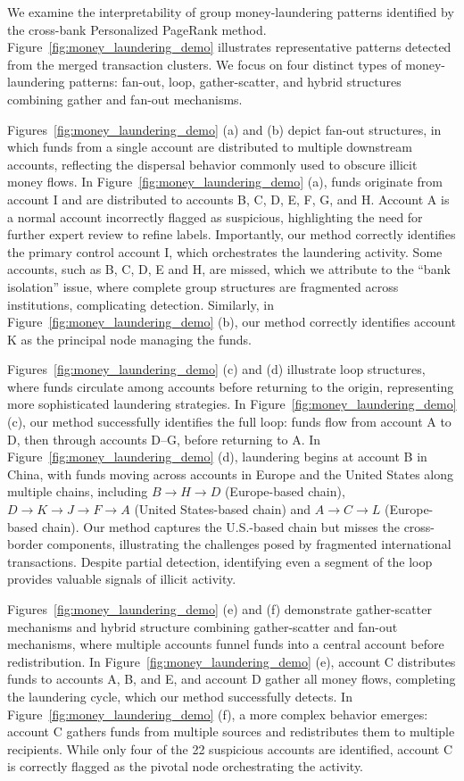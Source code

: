 We examine the interpretability of group money-laundering patterns identified by the cross-bank Personalized PageRank method. Figure~\ref{fig:money_laundering_demo} illustrates representative patterns detected from the merged transaction clusters. We focus on four distinct types of money-laundering patterns: fan-out, loop, gather-scatter, and hybrid structures combining gather and fan-out mechanisms.

Figures~\ref{fig:money_laundering_demo} (a) and (b) depict fan-out structures, in which funds from a single account are distributed to multiple downstream accounts, reflecting the dispersal behavior commonly used to obscure illicit money flows. In Figure~\ref{fig:money_laundering_demo} (a), funds originate from account I and are distributed to accounts B, C, D, E, F, G, and H. Account A is a normal account incorrectly flagged as suspicious, highlighting the need for further expert review to refine labels. Importantly, our method correctly identifies the primary control account I, which orchestrates the laundering activity. Some accounts, such as B, C, D, E and H, are missed, which we attribute to the “bank isolation” issue, where complete group structures are fragmented across institutions, complicating detection. Similarly, in Figure~\ref{fig:money_laundering_demo} (b), our method correctly identifies account K as the principal node managing the funds.

Figures~\ref{fig:money_laundering_demo} (c) and (d) illustrate loop structures, where funds circulate among accounts before returning to the origin, representing more sophisticated laundering strategies. In Figure~\ref{fig:money_laundering_demo} (c), our method successfully identifies the full loop: funds flow from account A to D, then through accounts D–G, before returning to A. In Figure~\ref{fig:money_laundering_demo} (d), laundering begins at account B in China, with funds moving across accounts in Europe and the United States along multiple chains, including $B \rightarrow H \rightarrow D$ (Europe-based chain), $D \rightarrow K \rightarrow J \rightarrow F \rightarrow A$ (United States-based chain) and  $A \rightarrow C \rightarrow L$ (Europe-based chain). Our method captures the U.S.-based chain but misses the cross-border components, illustrating the challenges posed by fragmented international transactions. Despite partial detection, identifying even a segment of the loop provides valuable signals of illicit activity.

Figures~\ref{fig:money_laundering_demo} (e) and (f) demonstrate gather-scatter mechanisms and hybrid structure combining gather-scatter and fan-out mechanisms, where multiple accounts funnel funds into a central account before redistribution. In Figure~\ref{fig:money_laundering_demo} (e), account C distributes funds to accounts A, B, and E, and account D gather all money flows, completing the laundering cycle, which our method successfully detects. In Figure~\ref{fig:money_laundering_demo} (f), a more complex behavior emerges: account C gathers funds from multiple sources and redistributes them to multiple recipients. While only four of the 22 suspicious accounts are identified, account C is correctly flagged as the pivotal node orchestrating the activity.

